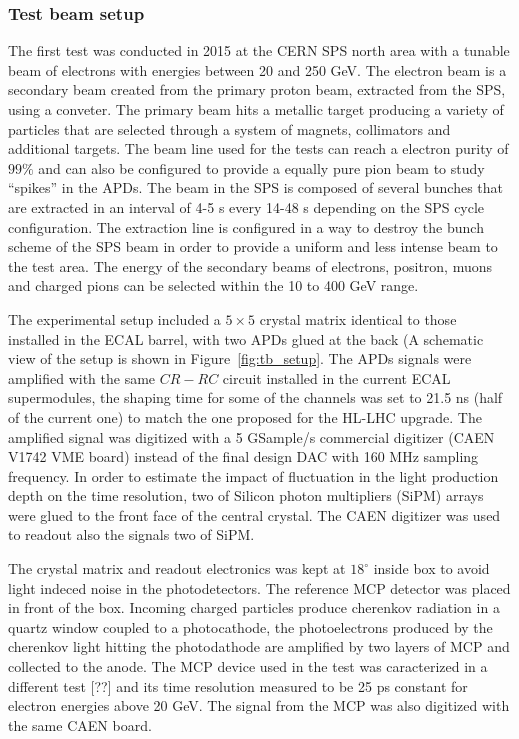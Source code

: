 \subsubsection{Test beam setup}
\label{sec:tb_2015}
The first test was conducted in 2015 at the CERN SPS north area with a tunable beam of electrons with energies between 20 and 250 GeV.
The electron beam is a secondary beam created from the primary proton beam, extracted from the SPS, using a conveter.
The primary beam hits a metallic target producing a variety of particles that are selected through a system of magnets, collimators
and additional targets. The beam line used for the tests can reach a electron purity of $99\%$ and can also be
configured to provide a equally pure pion beam to study ``spikes'' in the APDs.
The beam in the SPS is composed of several bunches that are extracted in an interval of 4-5 s every 14-48 s depending on the
SPS cycle configuration. The extraction line is configured in a way to destroy the bunch scheme of the SPS beam in order
to provide a uniform and less intense beam to the test area.
The energy of the secondary beams of electrons, positron, muons and charged pions can be selected within the 10 to 400 GeV
range. 

The experimental setup included a $5\times 5$ \PbWO crystal matrix identical to those installed in the ECAL barrel,
with two APDs glued at the back (A schematic view of the setup is shown in Figure~\ref{fig:tb_setup}.
The APDs signals were amplified with the same $CR-RC$ circuit installed in the current ECAL
supermodules, the shaping time for some of the channels was set to 21.5 ns (half of the current one) to match the
one proposed for the HL-LHC upgrade.
The amplified signal was digitized with a 5 GSample/s commercial digitizer (CAEN V1742 VME board)
instead of the final design
DAC with 160 MHz sampling frequency.
In order to estimate the impact of fluctuation in the light production depth on the time resolution,
two of Silicon photon multipliers (SiPM) arrays were glued to the front face of the central crystal.
The CAEN digitizer was used to readout also the signals two of SiPM.

The crystal matrix and readout electronics was kept at $18^{\circ}$ inside box to avoid
light indeced noise in the photodetectors. The reference MCP detector was placed in front of the box. 
Incoming charged particles produce cherenkov radiation in a quartz window coupled to a photocathode,
the photoelectrons produced by the cherenkov light hitting
the photodathode are amplified by two layers of MCP and collected to the anode. 
The MCP device used in the test was caracterized 
in a different test [??] and its time resolution measured to be 25 ps constant for electron energies
above 20 GeV. The signal from the MCP was also digitized with the same CAEN board.

